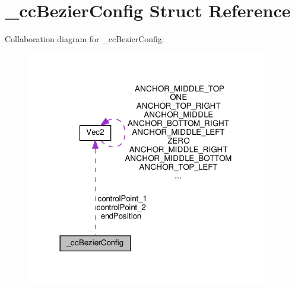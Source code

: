 \hypertarget{struct__ccBezierConfig}{}\section{\+\_\+cc\+Bezier\+Config Struct Reference}
\label{struct__ccBezierConfig}


Collaboration diagram for \+\_\+cc\+Bezier\+Config\+:
\nopagebreak
\begin{figure}[H]
\begin{center}
\leavevmode
\includegraphics[width=298pt]{struct__ccBezierConfig__coll__graph}
\end{center}
\end{figure}
